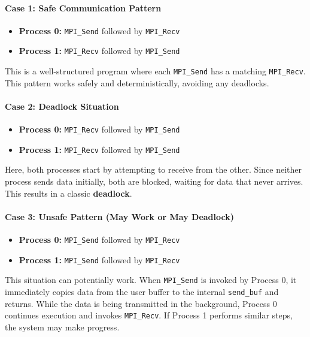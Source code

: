 \documentclass[12pt]{book}
\begin{document}
\paragraph{Case 1: Safe Communication Pattern}

\begin{itemize}
    \item \textbf{Process 0:} \texttt{MPI\_Send} followed by \texttt{MPI\_Recv}
    \item \textbf{Process 1:} \texttt{MPI\_Recv} followed by \texttt{MPI\_Send}
\end{itemize}

This is a well-structured program where each \texttt{MPI\_Send} has a matching \texttt{MPI\_Recv}. This pattern works safely and deterministically, avoiding any deadlocks.

\paragraph{Case 2: Deadlock Situation}

\begin{itemize}
    \item \textbf{Process 0:} \texttt{MPI\_Recv} followed by \texttt{MPI\_Send}
    \item \textbf{Process 1:} \texttt{MPI\_Recv} followed by \texttt{MPI\_Send}
\end{itemize}

Here, both processes start by attempting to receive from the other. Since neither process sends data initially, both are blocked, waiting for data that never arrives. This results in a classic \textbf{deadlock}.

\paragraph{Case 3: Unsafe Pattern (May Work or May Deadlock)}

\begin{itemize}
    \item \textbf{Process 0:} \texttt{MPI\_Send} followed by \texttt{MPI\_Recv}
    \item \textbf{Process 1:} \texttt{MPI\_Send} followed by \texttt{MPI\_Recv}
\end{itemize}

This situation can potentially work. When \texttt{MPI\_Send} is invoked by Process 0, it immediately copies data from the user buffer to the internal \texttt{send\_buf} and returns. While the data is being transmitted in the background, Process 0 continues execution and invokes \texttt{MPI\_Recv}. If Process 1 performs similar steps, the system may make progress.
\end{document}
